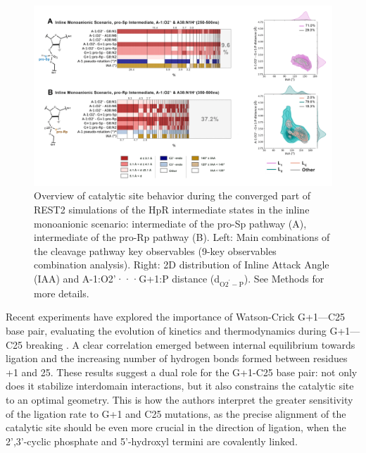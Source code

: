\documentclass[journal=jacsat,manuscript=article]{achemso}
\begin{document}
\begin{figure}[b!]
    \centering
    \includegraphics[width=1.0\textwidth]{figures/2D_orderedHbonds_A1P-A38H.png}
    \caption[Overview of the Inline Monoanionic Intermediates (ligated)]
    {Overview of catalytic site behavior during the converged part of REST2 simulations of the 
    HpR intermediate states in the inline monoanionic scenario: 
    intermediate of the pro-Sp pathway (A), 
    intermediate of the pro-Rp pathway (B). 
    Left: Main combinations of the cleavage pathway key observables (9-key observables combination analysis).
    Right: 2D distribution of Inline Attack Angle (IAA) and A-1:O2'···G+1:P distance (d$_\mathrm{O2^{\prime}-P}$). See Methods for more details.}
    \label{fig:2D_int_monoanionic}
\end{figure}

Recent experiments have explored the importance of Watson-Crick G+1---C25 base pair,
evaluating the evolution of kinetics and thermodynamics during G+1---C25 breaking \cite{cottrell_functional_2007}.
A clear correlation emerged between internal equilibrium towards ligation 
and the increasing number of hydrogen bonds formed between residues +1 and 25.
These results suggest a dual role for the G+1-C25 base pair: not only does it stabilize interdomain interactions,
but it also constrains the catalytic site to an optimal geometry.
This is how the authors interpret the greater sensitivity of the ligation rate to G+1 and C25 mutations,
as the precise alignment of the catalytic site should be even more crucial in the direction of ligation,
when the 2',3'-cyclic phosphate and 5'-hydroxyl termini are covalently linked.\\
\end{document}
